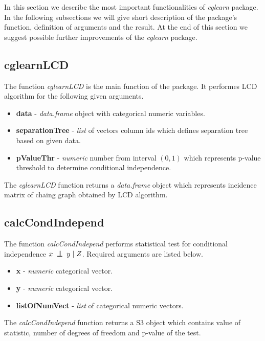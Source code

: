 %
%


In this section we describe the most important functionalities of \textit{cglearn} package.
In the following subsections we will give short description of the package's function, definition
of arguments and the result. At the end of this section we suggest possible further improvements of 
the \textit{cglearn} package.


\subsection{cglearnLCD}
The function \textit{cglearnLCD} is the main function of the package. It performes LCD algorithm for the 
following given arguments.

\begin{itemize}
	\item \textbf{data} - \textit{data.frame} object with categorical numeric variables.

	\item \textbf{separationTree} - \textit{list} of vectors column ids which defines separation tree based on given data.

	\item \textbf{pValueThr} - \textit{numeric} number from interval $(0, 1)$ which represents p-value threshold to determine conditional independence.
\end{itemize}

The \textit{cglearnLCD} function returns a \textit{data.frame} object which represents incidence matrix of chaing graph obtained by LCD algorithm.
 

\subsection{calcCondIndepend}
The function \textit{calcCondIndepend} performs statistical test for conditional independence $x \bigCI y \mid Z$. Required arguments
are listed below.

\begin{itemize}
	\item \textbf{x} - \textit{numeric} categorical vector.

	\item \textbf{y} - \textit{numeric} categorical vector.

	\item \textbf{listOfNumVect} - \textit{list} of categorical numeric vectors.
\end{itemize}

The \textit{calcCondIndepend} function returns a S3 object which contains value of statistic, number of degrees of freedom and p-value of the test.





